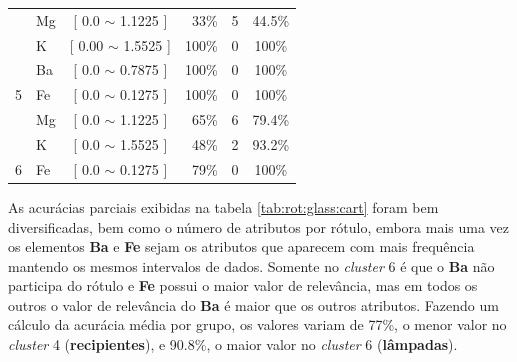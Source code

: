 \begin{table}[!h]
{\begin{tabular}{llcrcc}
                                            & Mg    & [ 0.0 $\sim$  1.1225 ]     & 33\%  & 5  & 44.5\% \\ 
                                            & K     & [ 0.00 $\sim$ 1.5525 ]     & 100\%  & 0 & 100\% \\ 
                                            & Ba     & [ 0.0 $\sim$  0.7875 ]    & 100\%  & 0 & 100\% \\  
\multirow{-4}{*}{5}                         & Fe    & [ 0.0 $\sim$  0.1275 ]     & 100\%  & 0 & 100\% \\  \hline
                                            & Mg    & [ 0.0 $\sim$  1.1225 ]     & 65\%  & 6  & 79.4\% \\ 
                                            & K     & [ 0.0 $\sim$ 1.5525 ]      & 48\%  & 2  & 93.2\% \\ 
\multirow{-3}{*}{6}                         & Fe    & [ 0.0 $\sim$  0.1275 ]     & 79\%  & 0  & 100\% \\  \hline

\end{tabular}
}
\end{table}


As acurácias parciais exibidas na tabela \ref{tab:rot:glass:cart} foram bem diversificadas, bem como o número de atributos por rótulo, embora mais uma vez os elementos \textbf{Ba} e \textbf{Fe} sejam os atributos que aparecem com mais frequência mantendo os mesmos intervalos de dados. Somente no \textit{cluster} 6 é que o \textbf{Ba} não participa do rótulo e \textbf{Fe} possui o maior valor de relevância, mas em todos os outros o valor de relevância do \textbf{Ba} é maior que os outros atributos. Fazendo um cálculo da acurácia média por grupo, os valores variam de 77\%, o menor valor no \textit{cluster} 4 (\textbf{recipientes}), e 90.8\%, o maior valor no \textit{cluster} 6 (\textbf{lâmpadas}).




